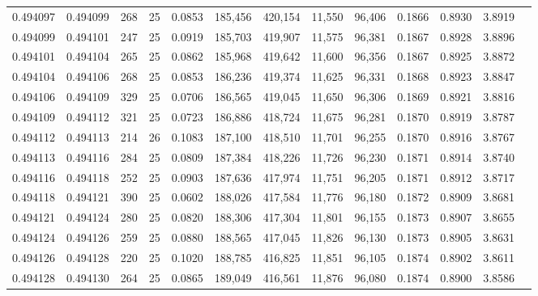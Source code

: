 \begin{tabular}{rrrrrrrrrrrrr}
0.494097 & 0.494099 &   268 &  25 &                                     0.0853 & 185,456 & 420,154 &  11,550 &  96,406 & 0.1866 & 0.8930 & 3.8919 \\
0.494099 & 0.494101 &   247 &  25 &                                     0.0919 & 185,703 & 419,907 &  11,575 &  96,381 & 0.1867 & 0.8928 & 3.8896 \\
0.494101 & 0.494104 &   265 &  25 &                                     0.0862 & 185,968 & 419,642 &  11,600 &  96,356 & 0.1867 & 0.8925 & 3.8872 \\
0.494104 & 0.494106 &   268 &  25 &                                     0.0853 & 186,236 & 419,374 &  11,625 &  96,331 & 0.1868 & 0.8923 & 3.8847 \\
0.494106 & 0.494109 &   329 &  25 &                                     0.0706 & 186,565 & 419,045 &  11,650 &  96,306 & 0.1869 & 0.8921 & 3.8816 \\
0.494109 & 0.494112 &   321 &  25 &                                     0.0723 & 186,886 & 418,724 &  11,675 &  96,281 & 0.1870 & 0.8919 & 3.8787 \\
0.494112 & 0.494113 &   214 &  26 &                                     0.1083 & 187,100 & 418,510 &  11,701 &  96,255 & 0.1870 & 0.8916 & 3.8767 \\
0.494113 & 0.494116 &   284 &  25 &                                     0.0809 & 187,384 & 418,226 &  11,726 &  96,230 & 0.1871 & 0.8914 & 3.8740 \\
0.494116 & 0.494118 &   252 &  25 &                                     0.0903 & 187,636 & 417,974 &  11,751 &  96,205 & 0.1871 & 0.8912 & 3.8717 \\
0.494118 & 0.494121 &   390 &  25 &                                     0.0602 & 188,026 & 417,584 &  11,776 &  96,180 & 0.1872 & 0.8909 & 3.8681 \\
0.494121 & 0.494124 &   280 &  25 &                                     0.0820 & 188,306 & 417,304 &  11,801 &  96,155 & 0.1873 & 0.8907 & 3.8655 \\
0.494124 & 0.494126 &   259 &  25 &                                     0.0880 & 188,565 & 417,045 &  11,826 &  96,130 & 0.1873 & 0.8905 & 3.8631 \\
0.494126 & 0.494128 &   220 &  25 &                                     0.1020 & 188,785 & 416,825 &  11,851 &  96,105 & 0.1874 & 0.8902 & 3.8611 \\
0.494128 & 0.494130 &   264 &  25 &                                     0.0865 & 189,049 & 416,561 &  11,876 &  96,080 & 0.1874 & 0.8900 & 3.8586 \\

\end{tabular}
